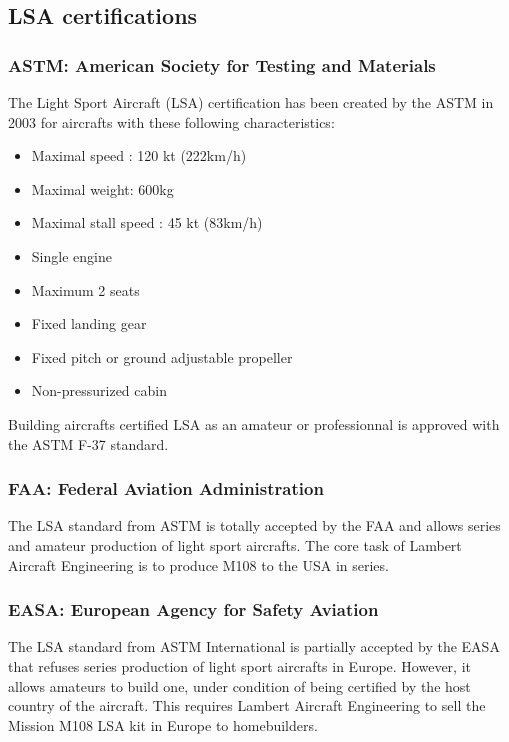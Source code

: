 \documentclass[11pt,a4paper]{article}
\begin{document}
\subsection{LSA certifications}
\label{subsec:certifications}
\subsubsection{ASTM: American Society for Testing and Materials}
The Light Sport Aircraft (LSA) certification has been created by the ASTM in 2003 for aircrafts with these following characteristics:
\begin{itemize}
\setlength{\itemsep}{0pt}
\item Maximal speed : 120 kt (222km/h)
\item Maximal weight: 600kg
\item Maximal stall speed : 45 kt (83km/h)
\item Single engine
\item Maximum 2 seats
\item Fixed landing gear
\item Fixed pitch or ground adjustable propeller
\item Non-pressurized cabin
\end{itemize}

\bigskip

Building aircrafts certified LSA as an amateur or professionnal is approved with the ASTM F-37 standard.

\subsubsection{FAA: Federal Aviation Administration}
The LSA standard from ASTM is totally accepted by the FAA and allows series and amateur production of light sport aircrafts. The core task of Lambert Aircraft Engineering is to produce M108 to the USA in series.

\subsubsection{EASA: European Agency for Safety Aviation}
The LSA standard from ASTM International is partially accepted by the EASA that refuses series production of light sport aircrafts in Europe. However, it allows amateurs to build one, under condition of being certified by the host country of the aircraft. This requires Lambert Aircraft Engineering to sell the Mission M108 LSA kit in Europe to homebuilders.
\end{document}
